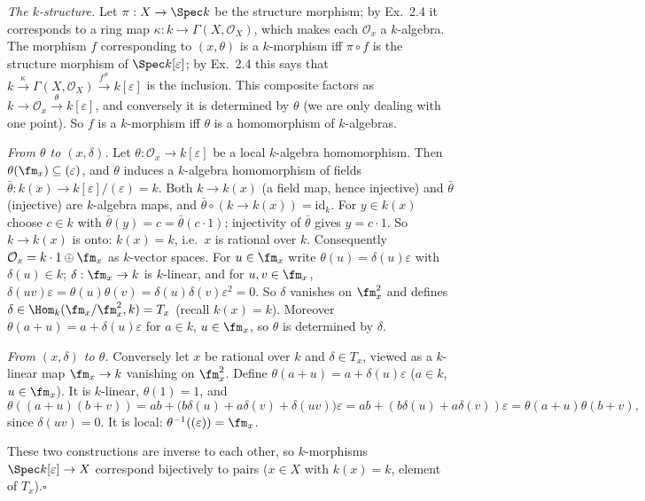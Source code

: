 \documentclass[11pt]{article}
\begin{document}
\emph{The $k$-structure.} Let $\pi:X\to\Spec k$ be the structure morphism; by Ex.~2.4 it corresponds to a ring map $\kappa:k\to\Gamma(X,\mathcal O_X)$, which makes each $\mathcal O_x$ a $k$-algebra. The morphism $f$ corresponding to $(x,\theta)$ is a $k$-morphism iff $\pi\circ f$ is the structure morphism of $\Spec k[\varepsilon]$; by Ex.~2.4 this says that $k\xrightarrow{\kappa}\Gamma(X,\mathcal O_X)\xrightarrow{f^\#}k[\varepsilon]$ is the inclusion. This composite factors as $k\to\mathcal O_x\xrightarrow{\theta}k[\varepsilon]$, and conversely it is determined by $\theta$ (we are only dealing with one point). So $f$ is a $k$-morphism iff $\theta$ is a homomorphism of $k$-algebras.

\emph{From $\theta$ to $(x,\delta)$.} Let $\theta:\mathcal O_x\to k[\varepsilon]$ be a local $k$-algebra homomorphism. Then $\theta(\fm_x)\subseteq(\varepsilon)$, and $\theta$ induces a $k$-algebra homomorphism of fields $\bar\theta:k(x)\to k[\varepsilon]/(\varepsilon)=k$. Both $k\to k(x)$ (a field map, hence injective) and $\bar\theta$ (injective) are $k$-algebra maps, and $\bar\theta\circ(k\to k(x))=\mathrm{id}_k$. For $y\in k(x)$ choose $c\in k$ with $\bar\theta(y)=c=\bar\theta(c\cdot1)$; injectivity of $\bar\theta$ gives $y=c\cdot 1$. So $k\to k(x)$ is onto: $k(x)=k$, i.e.\ $x$ is rational over $k$. Consequently $\mathcal O_x=k\cdot1\oplus\fm_x$ as $k$-vector spaces. For $u\in\fm_x$ write $\theta(u)=\delta(u)\varepsilon$ with $\delta(u)\in k$; $\delta:\fm_x\to k$ is $k$-linear, and for $u,v\in\fm_x$, $\delta(uv)\varepsilon=\theta(u)\theta(v)=\delta(u)\delta(v)\varepsilon^2=0$. So $\delta$ vanishes on $\fm_x^2$ and defines $\delta\in\Hom_k(\fm_x/\fm_x^2,k)=T_x$ (recall $k(x)=k$). Moreover $\theta(a+u)=a+\delta(u)\varepsilon$ for $a\in k$, $u\in\fm_x$, so $\theta$ is determined by $\delta$.

\emph{From $(x,\delta)$ to $\theta$.} Conversely let $x$ be rational over $k$ and $\delta\in T_x$, viewed as a $k$-linear map $\fm_x\to k$ vanishing on $\fm_x^2$. Define $\theta(a+u)=a+\delta(u)\varepsilon$ ($a\in k$, $u\in\fm_x$). It is $k$-linear, $\theta(1)=1$, and
\[\theta((a+u)(b+v))=ab+\bigl(b\delta(u)+a\delta(v)+\delta(uv)\bigr)\varepsilon=ab+(b\delta(u)+a\delta(v))\varepsilon=\theta(a+u)\theta(b+v),\]
since $\delta(uv)=0$. It is local: $\theta^{-1}((\varepsilon))=\fm_x$.

These two constructions are inverse to each other, so $k$-morphisms $\Spec k[\varepsilon]\to X$ correspond bijectively to pairs ($x\in X$ with $k(x)=k$, element of $T_x$).\hfill$\square$
\end{document}

